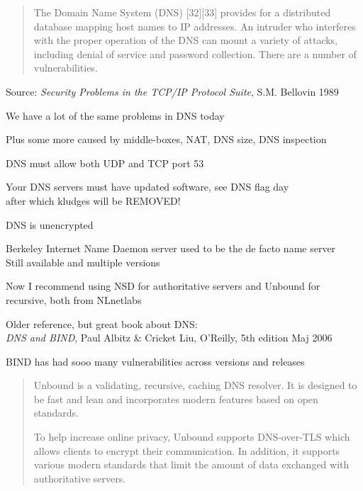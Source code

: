 \documentclass[Screen16to9,17pt]{foils}
\begin{document}
\begin{quote}
The Domain Name System (DNS) [32][33] provides for a distributed database mapping host names to IP
addresses. An intruder who interferes with the proper operation of the DNS can mount a variety of
attacks, including denial of service and password collection. There are a number of vulnerabilities.
\end{quote}
Source: \emph{Security Problems in the TCP/IP Protocol Suite}, S.M. Bellovin 1989\\

\begin{list1}
\item We have a lot of the same problems in DNS today
\item Plus some more caused by middle-boxes, NAT, DNS size, DNS inspection
\begin{list2}
\item DNS must allow both UDP and TCP port 53
\item Your DNS servers must have updated software, see DNS flag day\\
 after which kludges will be REMOVED!
\item DNS is unencrypted
\end{list2}
\end{list1}



\begin{list1}
\item Berkeley Internet Name Daemon server used to be the de facto name server\\
Still available and multiple versions
\item Now I recommend using NSD for authoritative servers and Unbound for recursive, both from NLnetlabs 
\end{list1}

\begin{list2}
\item Older reference, but great book about DNS:\\
\emph{DNS and BIND}, Paul Albitz \& Cricket Liu, O'Reilly, 5th
  edition Maj 2006
\item BIND has had sooo many vulnerabilities across versions and releases
\end{list2}



\begin{quote}
Unbound is a validating, recursive, caching DNS resolver. It is designed to be fast and lean and incorporates modern features based on open standards.

To help increase online privacy, Unbound supports DNS-over-TLS which allows clients to encrypt their communication. In addition, it supports various modern standards that limit the amount of data exchanged with authoritative servers.
\end{quote}
\end{document}
